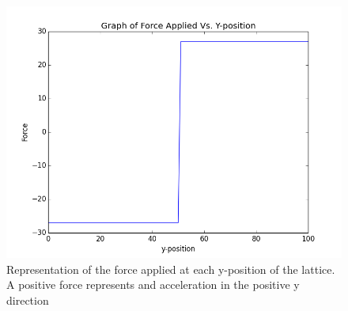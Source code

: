 \documentclass[12pt]{article}
\begin{document}
\begin{figure}[h]
	\centering
	\includegraphics[scale=0.5]{img/forceapplied}
	\caption{Representation of the force applied at each y-position of the lattice. A positive force represents and acceleration in the positive y direction}
	\label{forceapplied}
\end{figure}
\end{document}
